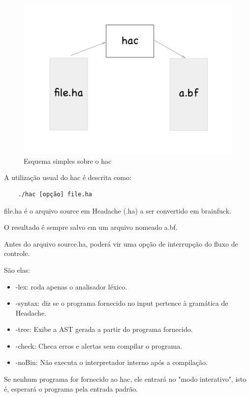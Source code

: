 \begin{figure}[h]
    \centering
	\includegraphics[]{TD/img/hac.png}
	\caption{Esquema simples sobre o hac}
	\label{hac}
\end{figure}

A utilização usual do hac é descrita como:

\begin{verbatim}
    ./hac [opção] file.ha
\end{verbatim}

file.ha é o arquivo source em Headache (.ha) a ser convertido em brainfuck. 

O resultado é sempre salvo em um arquivo nomeado a.bf.

Antes do arquivo source.ha, poderá vir uma opção de interrupção do fluxo de controle.

São elas: 

\begin{itemize}
    \item -lex: roda apenas o analisador léxico.
    \item -syntax: diz se o programa fornecido no input pertence à gramática de Headache.
    \item -tree: Exibe a AST gerada a partir do programa fornecido.
    \item -check: Checa erros e alertas sem compilar o programa.
    \item -noBin: Não executa o interpretador interno após a compilação.
\end{itemize}

Se nenhum programa for fornecido ao hac, ele entrará no "modo interativo", isto é, esperará o programa pela entrada padrão.

